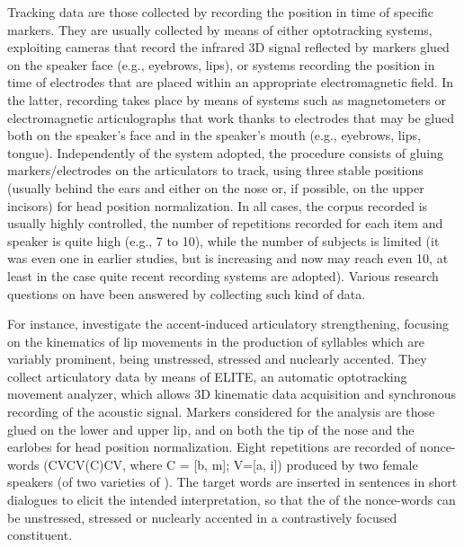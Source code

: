 \documentclass[output=paper]{langsci/langscibook}
\begin{document}
Tracking data are those collected by recording the position in time of specific markers. They are usually collected by means of either optotracking systems, exploiting cameras that record the infrared 3D signal reflected by markers glued on the speaker face (e.g., eyebrows, lips), or systems recording the position in time of electrodes that are placed within an appropriate electromagnetic field. In the latter, recording takes place by means of systems such as magnetometers or electromagnetic articulographs that work thanks to electrodes that may be glued both on the speaker’s face and in the speaker’s mouth (e.g., eyebrows, lips, tongue). Independently of the system adopted, the procedure consists of gluing markers\slash electrodes on the articulators to track, using three stable positions (usually behind the ears and either on the nose or, if possible, on the upper incisors) for head position normalization. In all cases, the corpus recorded is usually highly controlled, the number of repetitions recorded for each item and speaker is quite high (e.g., 7 to 10), while the number of subjects is limited (it was even one in earlier studies, but is increasing and now may reach even 10, at least in the case quite recent recording systems are adopted). Various research questions on  have been answered by collecting such kind of data. 

For instance, \citet{Avesani2007,Avesani2009} investigate the accent-induced articulatory strengthening, focusing on the kinematics of lip movements in the production of syllables which are variably prominent, being unstressed, stressed and nuclearly accented. They collect articulatory data by means of ELITE, an automatic optotracking movement analyzer, which allows 3D kinematic data acquisition and synchronous recording of the acoustic signal. Markers considered for the analysis are those glued on the lower and upper lip, and on both the tip of the nose and the earlobes for head position normalization. Eight repetitions are recorded of nonce-words (CVCV(C)CV, where C = [b, m]; V=[a, i]) produced by two female speakers (of two varieties of ). The target words are inserted in  sentences in short dialogues to elicit the intended interpretation, so that the  of the nonce-words can be unstressed, stressed or nuclearly accented in a contrastively focused constituent.\pagebreak
\end{document}
